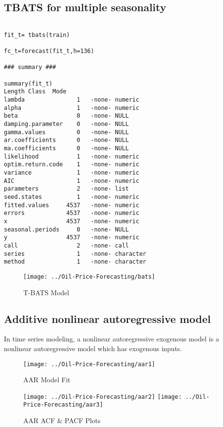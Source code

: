 \documentclass[11pt,a4paper]{article}
\begin{document}
\subsection{TBATS for multiple seasonality}

\begin{lstlisting}

fit_t= tbats(train)

fc_t=forecast(fit_t,h=136)

### summary ###

summary(fit_t)
Length Class  Mode     
lambda               1   -none- numeric  
alpha                1   -none- numeric  
beta                 0   -none- NULL     
damping.parameter    0   -none- NULL     
gamma.values         0   -none- NULL     
ar.coefficients      0   -none- NULL     
ma.coefficients      0   -none- NULL     
likelihood           1   -none- numeric  
optim.return.code    1   -none- numeric  
variance             1   -none- numeric  
AIC                  1   -none- numeric  
parameters           2   -none- list     
seed.states          1   -none- numeric  
fitted.values     4537   -none- numeric  
errors            4537   -none- numeric  
x                 4537   -none- numeric  
seasonal.periods     0   -none- NULL     
y                 4537   -none- numeric  
call                 2   -none- call     
series               1   -none- character
method               1   -none- character

\end{lstlisting}
\begin{figure}[h!]
	\centering
	\texttt{[image: ../Oil-Price-Forecasting/bats]}
	\caption{T-BATS Model}
	\label{fig:bats}
\end{figure}

\subsection{Additive nonlinear autoregressive model}
In time series modeling, a nonlinear autoregressive exogenous model  is a nonlinear autoregressive model which has exogenous inputs. 

\begin{figure}[h!]
	\centering
	\texttt{[image: ../Oil-Price-Forecasting/aar1]}
	\caption{AAR Model Fit}
	\label{fig:aar1}
\end{figure}


\begin{figure}[h!]
	\centering
	\texttt{[image: ../Oil-Price-Forecasting/aar2]}
	\texttt{[image: ../Oil-Price-Forecasting/aar3]}
	\caption{AAR ACF \& PACF Plots}
	\label{fig:aar2}
\end{figure}
\end{document}
